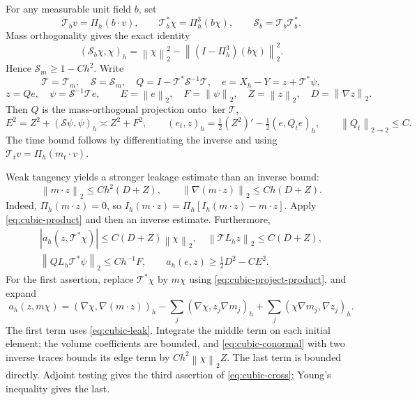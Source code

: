 \documentclass[11pt,a4paper]{article}
\numberwithin{equation}{section}
\theoremstyle{remark}
\newcommand{\norm}[1]{\left\lVert #1\right\rVert}
\begin{document}
For any measurable unit field \(b\), set
\[
 \mathcal T_b v=\Pi_h(b\cdot v),\qquad
 \mathcal T_b^*\chi=\Pi_h^3(b\chi),\qquad
 \mathcal S_b=\mathcal T_b\mathcal T_b^*.
\]
Mass orthogonality gives the exact identity
\begin{equation}\label{eq:cubic-schur-identity}
 (\mathcal S_b\chi,\chi)_h
       =\norm\chi_2^2-\norm{(I-\Pi_h^3)(b\chi)}_2^2.
\end{equation}
Hence \(\mathcal S_m\geq1-Ch^2\). Write
\[
 \mathcal T=\mathcal T_m,\quad\mathcal S=\mathcal S_m,\quad
 Q=I-\mathcal T^*\mathcal S^{-1}\mathcal T,
 \quad e=X_h-Y=z+\mathcal T^*\psi,
\]
\[
 z=Qe,\quad\psi=\mathcal S^{-1}\mathcal T e,\qquad
 E=\norm e_2,\quad F=\norm\psi_2,\quad Z=\norm z_2,
 \quad D=\norm{\nabla z}_2.
\]
Then \(Q\) is the mass-orthogonal projection onto \(\ker\mathcal T\),
\begin{equation}\label{eq:cubic-split}
 E^2=Z^2+(\mathcal S\psi,\psi)_h\asymp Z^2+F^2,
 \qquad (e_t,z)_h=\tfrac12(Z^2)'-\tfrac12(e,Q_t e)_h,
 \qquad\norm{Q_t}_{2\to2}\leq C.
\end{equation}
The time bound follows by differentiating the inverse and using
\(\mathcal T_t v=\Pi_h(m_t\cdot v)\).

Weak tangency yields a stronger leakage estimate than an inverse bound:
\begin{equation}\label{eq:cubic-leak}
 \norm{m\cdot z}_2\leq Ch^2(D+Z),\qquad
 \norm{\nabla(m\cdot z)}_2\leq Ch(D+Z).
\end{equation}
Indeed, \(\Pi_h(m\cdot z)=0\), so
\(I_h(m\cdot z)=\Pi_h[I_h(m\cdot z)-m\cdot z]\).
Apply \eqref{eq:cubic-product} and then an inverse estimate.
Furthermore,
\begin{equation}\label{eq:cubic-cross}
 \begin{gathered}
 |a_h(z,\mathcal T^*\chi)|\leq C(D+Z)\norm\chi_2,
 \quad\norm{\mathcal T L_hz}_2\leq C(D+Z),\\
 \norm{QL_h\mathcal T^*\psi}_2\leq Ch^{-1}F,
 \qquad a_h(e,z)\geq\tfrac12D^2-CE^2.
 \end{gathered}
\end{equation}
For the first assertion, replace \(\mathcal T^*\chi\) by \(m\chi\)
using \eqref{eq:cubic-project-product}, and expand
\[
 a_h(z,m\chi)=(\nabla\chi,\nabla(m\cdot z))_h
 -\sum_j(\nabla\chi,z_j\nabla m_j)_h
 +\sum_j(\chi\nabla m_j,\nabla z_j)_h.
\]
The first term uses \eqref{eq:cubic-leak}. Integrate the middle term
on each initial element; the volume coefficients are bounded, and
\eqref{eq:cubic-conormal} with two inverse traces bounds its edge term
by \(Ch^2\norm\chi_2Z\). The last term is bounded directly.
Adjoint testing gives the third assertion of \eqref{eq:cubic-cross};
Young's inequality gives the last.
\end{document}
